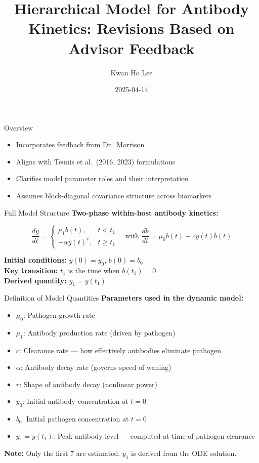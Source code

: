 \documentclass[
  ignorenonframetext,
]{beamer}
\title{Hierarchical Model for Antibody Kinetics: Revisions Based on
Advisor Feedback}
\author{Kwan Ho Lee}
\date{2025-04-14}
\institute{UC Davis}
\providecommand{\tightlist}{%
  \setlength{\itemsep}{0pt}\setlength{\parskip}{0pt}}\usepackage{longtable,booktabs,array}
\begin{document}
\frame{\titlepage}


\begin{frame}{Overview}
\label{overview}
\begin{itemize}
\tightlist
\item
  Incorporates feedback from Dr.~Morrison
\item
  Aligns with Teunis et al.~(2016, 2023) formulations
\item
  Clarifies model parameter roles and their interpretation
\item
  Assumes block-diagonal covariance structure across biomarkers
\end{itemize}
\end{frame}

\begin{frame}{Full Model Structure}
\label{full-model-structure}
\textbf{Two-phase within-host antibody kinetics:}

\[
\frac{dy}{dt} = 
\begin{cases}
\mu_1 b(t), & t < t_1 \\
- \alpha y(t)^r, & t \ge t_1
\end{cases}
\quad \text{with } 
\frac{db}{dt} = \mu_0 b(t) - c y(t) b(t)
\]

\textbf{Initial conditions:} \(y(0) = y_0\), \(b(0) = b_0\)\\
\textbf{Key transition:} \(t_1\) is the time when \(b(t_1) = 0\)\\
\textbf{Derived quantity:} \(y_1 = y(t_1)\)
\end{frame}

\begin{frame}{Definition of Model Quantities}
\label{definition-of-model-quantities}
\textbf{Parameters used in the dynamic model:}

\begin{itemize}
\tightlist
\item
  \(\mu_0\): Pathogen growth rate\\
\item
  \(\mu_1\): Antibody production rate (driven by pathogen)\\
\item
  \(c\): Clearance rate --- how effectively antibodies eliminate
  pathogen\\
\item
  \(\alpha\): Antibody decay rate (governs speed of waning)\\
\item
  \(r\): Shape of antibody decay (nonlinear power)\\
\item
  \(y_0\): Initial antibody concentration at \(t = 0\)\\
\item
  \(b_0\): Initial pathogen concentration at \(t = 0\)\\
\item
  \(y_1 = y(t_1)\): Peak antibody level --- computed at time of pathogen
  clearance
\end{itemize}

\textbf{Note:} Only the first 7 are estimated. \(y_1\) is derived from
the ODE solution.
\end{frame}
\end{document}
